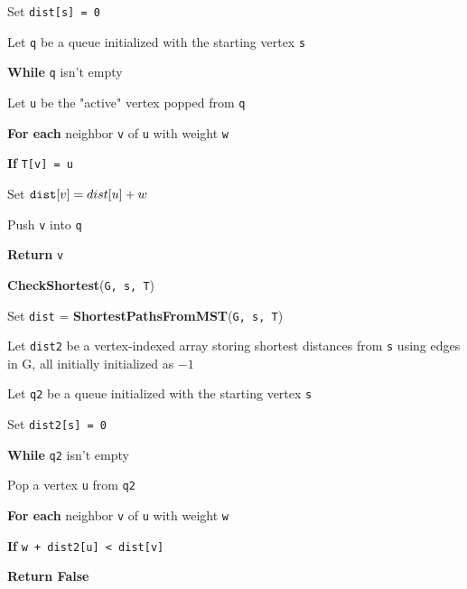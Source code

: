 \documentclass[11pt]{article}
\begin{document}
\begin{enumerate}[leftmargin=*,start=0]
\begin{enumerate}
\hspace{5mm} Set \verb|dist[s] = 0|

\hspace{5mm} Let \verb|q| be a queue initialized with the starting vertex \verb|s|

\hspace{5mm} \textbf{While} \verb|q| isn't empty

\hspace{10mm} Let \verb|u| be the "active" vertex popped from \verb|q|

\hspace{10mm} \textbf{For each} neighbor \verb|v| of \verb|u| with weight \verb|w|

\hspace{15mm} \textbf{If} \verb|T[v] = u|

\hspace{20mm} Set $\verb|dist|[v] = dist[u] + w$

\hspace{20mm} Push \verb|v| into \verb|q|

\hspace{5mm} \textbf{Return} \verb|v|

\hfill

\textbf{CheckShortest}(\verb|G, s, T|)

\hspace{5mm} Set \verb|dist| = \textbf{ShortestPathsFromMST}(\verb|G, s, T|)

\hspace{5mm} Let \verb|dist2| be a vertex-indexed array storing shortest distances from \verb|s| using edges in G, all initially initialized as $-1$

\hspace{5mm} Let \verb|q2| be a queue initialized with the starting vertex \verb|s|

\hspace{5mm} Set \verb|dist2[s] = 0|

\hspace{5mm} \textbf{While} \verb|q2| isn't empty

\hspace{10mm} Pop a vertex \verb|u| from \verb|q2|

\hspace{10mm} \textbf{For each} neighbor \verb|v| of \verb|u| with weight \verb|w|

\hspace{15mm} \textbf{If} \verb|w + dist2[u] < dist[v]|

\hspace{20mm} \textbf{Return False} 


\end{enumerate}
\end{enumerate}
\end{document}
